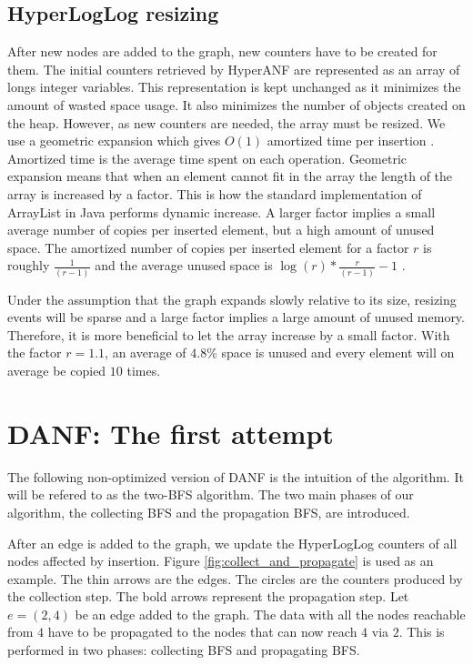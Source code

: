 \subsection{HyperLogLog resizing}
After new nodes are added to the graph, new counters have to be created for them. The initial counters retrieved by HyperANF are represented as an array of longs integer variables. This representation is kept unchanged as it minimizes the amount of wasted space usage. It also minimizes the number of objects created on the heap. However, as new counters are needed, the array must be resized. We use a geometric expansion which gives $O(1)$ amortized time per insertion \cite{dynamicarrays}. Amortized time is the average time spent on each operation. Geometric expansion means that when an element cannot fit in the array the length of the array is increased by a factor. This is how the standard implementation of ArrayList in Java performs dynamic increase. A larger factor implies a small average number of copies per inserted element, but a high amount of unused space. The amortized number of copies per inserted element for a factor $r$ is roughly $\frac{1}{(r-1)}$ and the average unused space is $\log(r)*\frac{r}{(r-1)} - 1$ \cite{dynamicarrays}.

Under the assumption that the graph expands slowly relative to its size, resizing events will be sparse and a large factor implies a large amount of unused memory. Therefore, it is more beneficial to let the array increase by a small factor. With the factor $r = 1.1$, an average of $4.8$\% space is unused and every element will on average be copied $10$ times.

\section{DANF: The first attempt}

The following non-optimized version of DANF is the intuition of the algorithm. It will be refered to as the two-BFS algorithm. The two main phases of our algorithm, the collecting BFS and the propagation BFS, are introduced. 

After an edge is added to the graph, we update the HyperLogLog counters of all nodes affected by insertion. Figure \ref{fig:collect_and_propagate} is used as an example. The thin arrows are the edges. The circles are the counters produced by the collection step. The bold arrows represent the propagation step. Let $e = (2,4)$ be an edge added to the graph. The data with all the nodes reachable from $4$ have to be propagated to the nodes that can now reach $4$ via $2$. This is performed in two phases: collecting BFS and propagating BFS.

